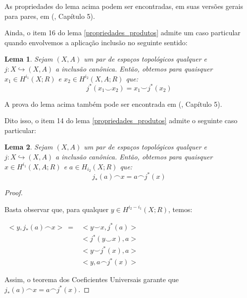 \documentclass[12pt,oneside]{book} %
\newtheorem{lem}    {\hspace{0.5cm}Lema}[chapter]
\newcommand{\ccup}{\smile}
\newcommand{\ccap}{\frown}
\begin{document}
\par As propriedades do lema acima podem ser encontradas, em suas versões gerais para pares, em (\cite{spanier}, Capítulo 5).

\par Ainda, o item 16 do lema \ref{propriedades_produtos} admite um caso particular quando envolvemos a aplicação inclusão no seguinte sentido:

\begin{lem}\label{propriedades_produtos_2}
	Sejam $(X,A)$ um par de espaços topológicos qualquer e $j:X\hookrightarrow (X,A)$ a inclusão canônica. Então, obtemos para quaisquer $x_{1}\in H^{i_{1}}(X;R)$ e $x_{2}\in H^{i_{2}}(X,A;R)$ que:
	$$ j^{*}(x_{1}\ccup x_{2})=x_{1}\ccup j^{*}(x_{2}) $$
\end{lem}

\par A prova do lema acima também pode ser encontrada em (\cite{spanier}, Capítulo 5).

\par Dito isso, o item 14 do lema \ref{propriedades_produtos} admite o seguinte caso particular:

\begin{lem}\label{propriedades_produtos_3}
	Sejam $(X,A)$ um par de espaços topológicos qualquer e $j:X\hookrightarrow (X,A)$ a inclusão canônica. Então, obtemos para quaisquer $x\in H^{i_{1}}(X,A;R)$ e $a\in H_{i_{2}}(X;R)$ que:
	$$ j_{*}(a)\ccap x=a\ccap j^{*}(x) $$
\end{lem}

\begin{proof}
	
	\
	
	\par Basta observar que, para qualquer $y\in H^{i_{2}-i_{1}}(X;R)$, temos: \newline
	
	$\begin{array}{rl}
		<y,j_{*}(a)\ccap x> \ = & <y\ccup x,j^{*}(a)> \\
		& <j^{*}(y\ccup x),a> \\
		& <y\ccup j^{*}(x),a> \\
		& <y,a\ccap j^{*}(x)>
	\end{array}$ \newline
	
	\par Assim, o teorema dos Coeficientes Universais garante que $j_{*}(a)\ccap x=a\ccap j^{*}(x)$.
	
\end{proof}
\end{document}
